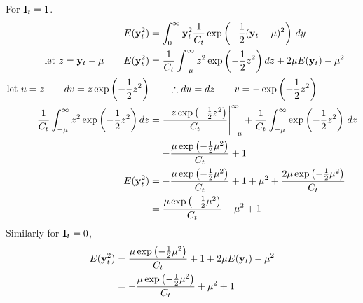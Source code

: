 \begin{appendices}
For $\mathbf{I}_t=1$.
\begin{align}
\nonumber E(\mathbf{y}_t^2)&=\int_{0}^{\infty}\mathbf{y}_t^2\frac{1}{C_t}\exp\left(-\frac{1}{2}(\mathbf{y}_t-\mu)^2\right)\,dy \\
\nonumber \text{let }z=\mathbf{y}_t-\mu \qquad E(\mathbf{y}_t^2)&=\frac{1}{C_t}\int_{-\mu}^{\infty}z^2\exp\left(-\frac{1}{2}z^2\right)dz+2\mu E(\mathbf{y}_t)-\mu^2\\
\nonumber \text{let } u=z\qquad dv=z\exp\left(-\frac{1}{2}z^2\right) &\qquad \therefore du=dz \qquad v=-\exp\left(-\frac{1}{2}z^2\right)\\
\nonumber \frac{1}{C_t}\int_{-\mu}^{\infty}z^2\exp\left(-\frac{1}{2}z^2\right)dz &=\frac{-z\exp\left(-\frac{1}{2}z^2\right)}{C_t}\Bigg|_{-\mu}^\infty+\frac{1}{C_t}\int_{-\mu}^{\infty}\exp\left(-\frac{1}{2}z^2\right)\,dz\\
\nonumber &=-\frac{\mu\exp\left(-\frac{1}{2}\mu^2\right)}{C_t}+1\\
\nonumber E(\mathbf{y}_t^2)&=-\frac{\mu\exp\left(-\frac{1}{2}\mu^2\right)}{C_t}+1+\mu^2+\frac{2\mu\exp\left(-\frac{1}{2}\mu^2\right)}{C_t}\\
&=\frac{\mu\exp\left(-\frac{1}{2}\mu^2\right)}{C_t}+\mu^2+1
\end{align}
Similarly for $\mathbf{I}_t=0$,
\begin{align}
\nonumber E(\mathbf{y}_t^2)&=\frac{\mu\exp\left(-\frac{1}{2}\mu^2\right)}{C_t}+1+2\mu E(\mathbf{y}_t)-\mu^2\\
&=-\frac{\mu\exp\left(-\frac{1}{2}\mu^2\right)}{C_t}+\mu^2+1
\end{align}




\end{appendices}
